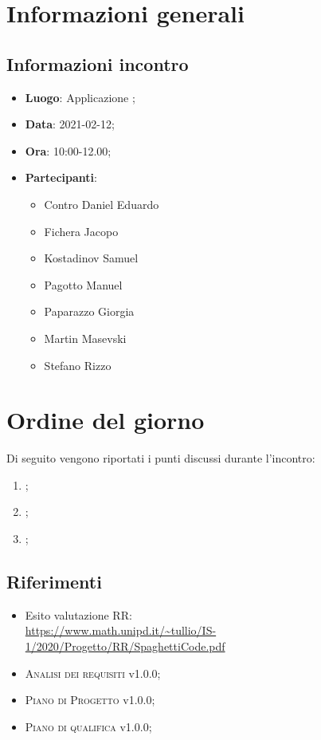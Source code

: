 \documentclass{article}
\begin{document}


\section{Informazioni generali}
\label{sec:info_generali}

\subsection{Informazioni incontro}
\label{sub:info_incontro}

\begin{itemize}
	\item \textbf{Luogo}: Applicazione ;
	\item \textbf{Data}: 2021-02-12;
	\item \textbf{Ora}: 10:00-12.00;
	\item \textbf{Partecipanti}:
	\begin{itemize}
		\item Contro Daniel Eduardo
		\item Fichera Jacopo
		\item Kostadinov Samuel
		\item Pagotto Manuel
		\item Paparazzo Giorgia
		\item Martin Masevski
		\item Stefano Rizzo
	\end{itemize}
\end{itemize}

\section{Ordine del giorno}%
\label{sec:ordine_del_giorno}

Di seguito vengono riportati i punti discussi durante l'incontro:
\begin{enumerate}
	\item {};
	\item {};
	\item {};
\end{enumerate}


\subsection{Riferimenti}%
\label{sub:riferimenti}
\begin{itemize}
	\item Esito valutazione RR: \\
		\url{https://www.math.unipd.it/~tullio/IS-1/2020/Progetto/RR/SpaghettiCode.pdf}
    \item \textsc{Analisi dei requisiti} v1.0.0;
    \item \textsc{Piano di Progetto} v1.0.0;
    \item \textsc{Piano di qualifica} v1.0.0;
    \end{itemize}
\end{document}
